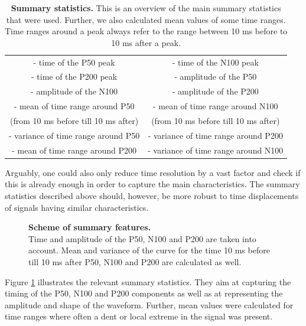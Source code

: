 \documentclass[12pt]{extreport}
\begin{document}
\vspace{10pt}

\begin{table}
\begin{tabular}{c | c }
    \small 
    - time of the P50 peak & \small - time of the N100 peak  \\
    - time of the P200 peak & - amplitude of the P50 \\
    - amplitude of the N100 & - amplitude of the P200\\
    - mean of time range around P50  & - mean of time range around N100 \\
      (from 10 ms before till 10 ms after) &  (from 10 ms before till 10 ms after)\\
    - variance of time range around P50  & - variance of time range around P200 \\
    - mean of time range around P200 & - variance of time range around N100  \\


\end{tabular}
\caption{\label{tab:summary}\textbf{Summary statistics.} \small This is an overview of the main summary statistics that were used. Further, we also calculated mean values of some time ranges. Time ranges around a peak always refer to the range between 10 ms before to 10 ms after a peak.}
\end{table}


Arguably, one could also only reduce time resolution by a vast factor and check if this is already enough in order to capture the main characteristics. The summary statistics described above should, however, be more robust to time displacements of signals having similar characteristics.

\begin{figure}
  \centering

  
  \caption{\label{summary_stats}\textbf{Scheme of summary features. }\\\small
    Time and amplitude of the P50, N100 and P200 are taken into account. Mean and variance of the curve for the time 10 ms before till 10 ms after P50, N100 and P200 are calculated as well.}
  
    

\end{figure}

Figure \ref{summary_stats} illustrates the relevant summary statistics. They aim at capturing the timing of the P50, N100 and P200 components as well as at representing the amplitude and shape of the waveform. 
Further, mean values were calculated for time ranges where often a dent or local extreme in the signal was present.  
\end{document}
